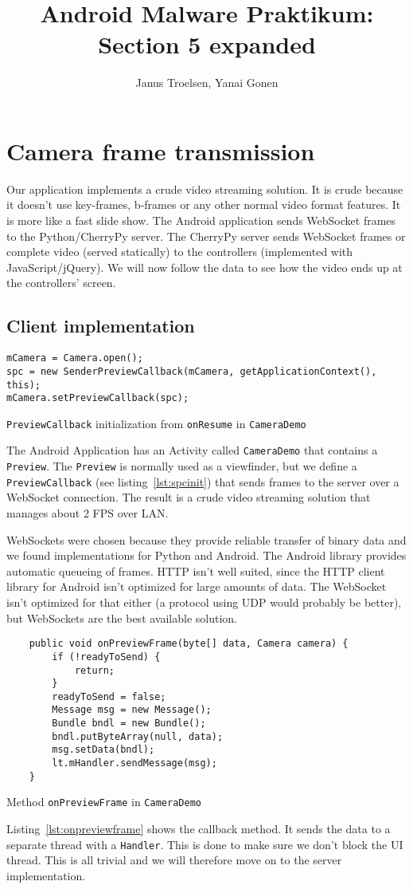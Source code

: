 \documentclass[a4paper]{report}
\author{Janus Troelsen, Yanai Gonen}
\title{Android Malware Praktikum: Section 5 expanded}
\newcommand{\classname}[1]{\texttt{#1}}
\newcommand{\methodname}[1]{\texttt{#1}}
\begin{document}
\maketitle
\tableofcontents
\chapter{Camera frame transmission}
Our application implements a crude video streaming solution. It is crude because it doesn't use key-frames, b-frames or any other normal video format features. It is more like a fast slide show. The Android application sends WebSocket frames to the Python/CherryPy server. The CherryPy server sends WebSocket frames or complete video (served statically) to the controllers (implemented with JavaScript/jQuery). We will now follow the data to see how the video ends up at the controllers' screen.
\section{Client implementation}
\begin{listing}[H]
\begin{verbatim}
mCamera = Camera.open();
spc = new SenderPreviewCallback(mCamera, getApplicationContext(), this);
mCamera.setPreviewCallback(spc);
\end{verbatim}
\caption{\classname{PreviewCallback} initialization from \methodname{onResume} in \classname{CameraDemo}}
\label{lst:spcinit}
\end{listing}
The Android Application has an Activity called \classname{CameraDemo} that contains a \classname{Preview}. The \classname{Preview} is normally used as a viewfinder, but we define a \classname{PreviewCallback} (see listing~\ref{lst:spcinit}) that sends frames to the server over a WebSocket connection. The result is a crude video streaming solution that manages about 2 FPS over LAN.

WebSockets were chosen because they provide reliable transfer of binary data and we found implementations for Python and Android. The Android library provides automatic queueing of frames. HTTP isn't well suited, since the HTTP client library for Android isn't optimized for large amounts of data. The WebSocket isn't optimized for that either (a protocol using UDP would probably be better), but WebSockets are the best available solution.

\begin{listing}[H]
\begin{verbatim}
	public void onPreviewFrame(byte[] data, Camera camera) {
		if (!readyToSend) {
			return;
		}
		readyToSend = false;
		Message msg = new Message();
		Bundle bndl = new Bundle();
		bndl.putByteArray(null, data);
		msg.setData(bndl);
		lt.mHandler.sendMessage(msg);
	}
\end{verbatim}
\caption{Method \methodname{onPreviewFrame} in \classname{CameraDemo}}
\label{lst:onpreviewframe}
\end{listing}
Listing~\ref{lst:onpreviewframe} shows the callback method. It sends the data to a separate thread with a \classname{Handler}. This is done to make sure we don't block the UI thread. This is all trivial and we will therefore move on to the server implementation.
\end{document}
